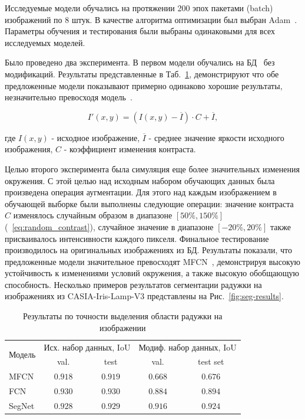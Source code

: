 Исследуемые модели обучались на протяжении 200 эпох пакетами (batch) изображений по 8 штук. В качестве алгоритма оптимизации был выбран Adam~\cite{kingma_2014}. Параметры обучения и тестирования были выбраны одинаковыми для всех исследуемых моделей.

Было проведено два эксперимента. В первом модели обучались на БД~\cite{casia_v3_lamp} без модификаций. Результаты представленные в Таб.~\ref{tab:seg-results}, демонстрируют что обе предложенные модели показывают примерно одинаково хорошие результаты, незначительно превосходя модель~\cite{liu_2016}.

\begin{equation}
\label{eq:random_contrast}
I'(x,y) = (I(x,y) - \overline{I}) \cdot C + \overline{I},
\end{equation}

\noindent
где $I(x,y)$ - исходное изображение, $\overline{I}$ - среднее значение яркости исходного изображения, $C$ - коэффициент изменения контраста.

Целью второго эксперимента была симуляция еще более значительных изменения окружения. С этой целью над исходным набором обучающих данных была произведена операция аугментации. Для этого над каждым изображением в обучающей выборке были выполнены следующие операции: значение контраста $C$ изменялось случайным образом в диапазоне $[50\%, 150\%]$ (~\ref{eq:random_contrast}), случайное значение в диапазоне $[-20\%, 20\%]$ также присваивалось интенсивности каждого пикселя. Финальное тестирование производилось на оригинальных изображениях из БД. Результаты показали, что предложенные модели значительное превосходят MFCN~\cite{liu_2016}, демонстрируя высокую устойчивость к изменениями условий окружения, а также высокую обобщающую способность. Несколько примеров результатов сегментации радужки на изображениях из CASIA-Iris-Lamp-V3 представлены на Рис.~\ref{fig:seg-results}.

\begin{table}[t]
	\begin{center}
		\begin{tabular}{|l|c|c|c|c|}
			\hline
			\multirow{2}{*}{Модель} & \multicolumn{2}{|c|}{Исх. набор данных, IoU} & \multicolumn{2}{|c|}{Модиф. набор данных, IoU} \\ \cline{2-5}
			\space 	& val. 	& test 	& val. 	& test set \\ \hline
			MFCN 	& $0.918$ 				& $0.919$ 				& $0.668$ 				& $0.676$ \\ \hline
			FCN 	& $0.930$ 				& $0.930$ 				& $0.884$ 				& $0.894$ \\ \hline
			SegNet 	& $0.928$ 				& $0.929$ 				& $0.916$ 				& $0.924$ \\ \hline
		\end{tabular}
		\caption{Результаты по точности выделения области радужки на изображении}
		\label{tab:seg-results}
	\end{center}
\end{table}

